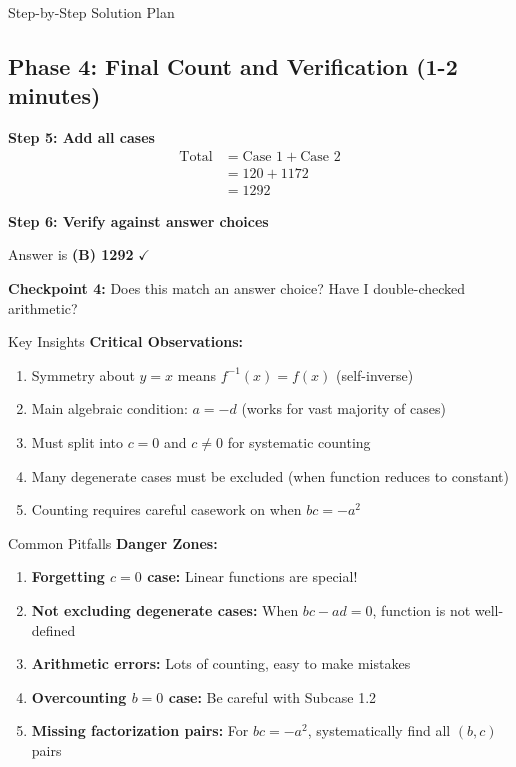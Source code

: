 \documentclass[12pt]{article}
\begin{document}
\begin{roadmapbox}{Step-by-Step Solution Plan}
\subsection*{Phase 4: Final Count and Verification (1-2 minutes)}

\textbf{Step 5: Add all cases}
\begin{align*}
\text{Total} &= \text{Case 1} + \text{Case 2}\\
&= 120 + 1172\\
&= 1292
\end{align*}

\textbf{Step 6: Verify against answer choices}

Answer is \textbf{(B) 1292} $\checkmark$

\textbf{Checkpoint 4:} Does this match an answer choice? Have I double-checked arithmetic?

\end{roadmapbox}

\begin{highlightbox}{Key Insights}
\textbf{Critical Observations:}
\begin{enumerate}
    \item Symmetry about $y=x$ means $f^{-1}(x) = f(x)$ (self-inverse)
    \item Main algebraic condition: $a=-d$ (works for vast majority of cases)
    \item Must split into $c=0$ and $c \neq 0$ for systematic counting
    \item Many degenerate cases must be excluded (when function reduces to constant)
    \item Counting requires careful casework on when $bc = -a^2$
\end{enumerate}
\end{highlightbox}

\begin{warningbox}{Common Pitfalls}
\textbf{Danger Zones:}
\begin{enumerate}
    \item \textbf{Forgetting $c=0$ case:} Linear functions are special!
    \item \textbf{Not excluding degenerate cases:} When $bc-ad=0$, function is not well-defined
    \item \textbf{Arithmetic errors:} Lots of counting, easy to make mistakes
    \item \textbf{Overcounting $b=0$ case:} Be careful with Subcase 1.2
    \item \textbf{Missing factorization pairs:} For $bc=-a^2$, systematically find all $(b,c)$ pairs
\end{enumerate}
\end{warningbox}
\end{document}
